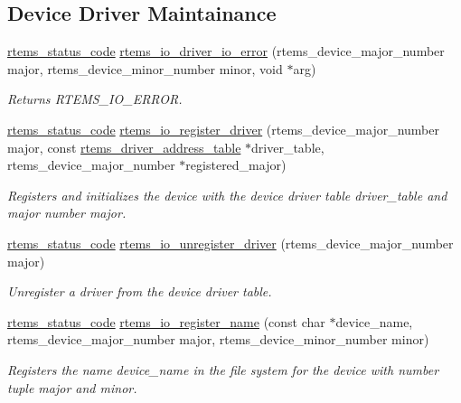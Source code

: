 \subsection*{Device Driver Maintainance}
\begin{DoxyCompactItemize}
\item 
\mbox{\hyperlink{group__ClassicStatus_ga545d41846817eaba6143d52ee4d9e9fe}{rtems\+\_\+status\+\_\+code}} \mbox{\hyperlink{group__ClassicIO_ga95d2732c145364a244ffc6b5150e14ba}{rtems\+\_\+io\+\_\+driver\+\_\+io\+\_\+error}} (rtems\+\_\+device\+\_\+major\+\_\+number major, rtems\+\_\+device\+\_\+minor\+\_\+number minor, void $\ast$arg)
\begin{DoxyCompactList}\small\item\em Returns {\ttfamily R\+T\+E\+M\+S\+\_\+\+I\+O\+\_\+\+E\+R\+R\+OR}. \end{DoxyCompactList}\item 
\mbox{\hyperlink{group__ClassicStatus_ga545d41846817eaba6143d52ee4d9e9fe}{rtems\+\_\+status\+\_\+code}} \mbox{\hyperlink{group__ClassicIO_gaa47cf2e1f0bc2a31f6c55f71dd12b8ea}{rtems\+\_\+io\+\_\+register\+\_\+driver}} (rtems\+\_\+device\+\_\+major\+\_\+number major, const \mbox{\hyperlink{structrtems__driver__address__table}{rtems\+\_\+driver\+\_\+address\+\_\+table}} $\ast$driver\+\_\+table, rtems\+\_\+device\+\_\+major\+\_\+number $\ast$registered\+\_\+major)
\begin{DoxyCompactList}\small\item\em Registers and initializes the device with the device driver table {\itshape driver\+\_\+table} and major number {\itshape major}. \end{DoxyCompactList}\item 
\mbox{\hyperlink{group__ClassicStatus_ga545d41846817eaba6143d52ee4d9e9fe}{rtems\+\_\+status\+\_\+code}} \mbox{\hyperlink{group__ClassicIO_ga36aac167cf8d6275d0ac74142acd5706}{rtems\+\_\+io\+\_\+unregister\+\_\+driver}} (rtems\+\_\+device\+\_\+major\+\_\+number major)
\begin{DoxyCompactList}\small\item\em Unregister a driver from the device driver table. \end{DoxyCompactList}\item 
\mbox{\hyperlink{group__ClassicStatus_ga545d41846817eaba6143d52ee4d9e9fe}{rtems\+\_\+status\+\_\+code}} \mbox{\hyperlink{group__ClassicIO_ga26d953ea9e5acc028dd528e85ddef6f5}{rtems\+\_\+io\+\_\+register\+\_\+name}} (const char $\ast$device\+\_\+name, rtems\+\_\+device\+\_\+major\+\_\+number major, rtems\+\_\+device\+\_\+minor\+\_\+number minor)
\begin{DoxyCompactList}\small\item\em Registers the name {\itshape device\+\_\+name} in the file system for the device with number tuple {\itshape major} and {\itshape minor}. \end{DoxyCompactList}\end{DoxyCompactItemize}


